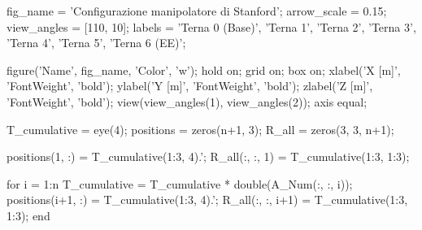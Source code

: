 \documentclass[11pt, a4paper]{article}
\begin{document}
\begin{matlabcode}
fig_name    = 'Configurazione manipolatore di Stanford';
arrow_scale = 0.15;
view_angles = [110, 10];
labels      = {'Terna 0 (Base)', 'Terna 1', 'Terna 2', 'Terna 3', 'Terna 4', 'Terna 5', 'Terna 6 (EE)'};

figure('Name', fig_name, 'Color', 'w');
hold on;
grid on;
box on;
xlabel('X [m]', 'FontWeight', 'bold');
ylabel('Y [m]', 'FontWeight', 'bold');
zlabel('Z [m]', 'FontWeight', 'bold');
view(view_angles(1), view_angles(2));
axis equal;

T_cumulative = eye(4);
positions = zeros(n+1, 3);
R_all     = zeros(3, 3, n+1);

positions(1, :) = T_cumulative(1:3, 4).';
R_all(:, :, 1)  = T_cumulative(1:3, 1:3);

for i = 1:n
    T_cumulative = T_cumulative * double(A_Num(:, :, i));
    positions(i+1, :) = T_cumulative(1:3, 4).';
    R_all(:, :, i+1)  = T_cumulative(1:3, 1:3);
end
\end{matlabcode}
\newpage
\end{document}
